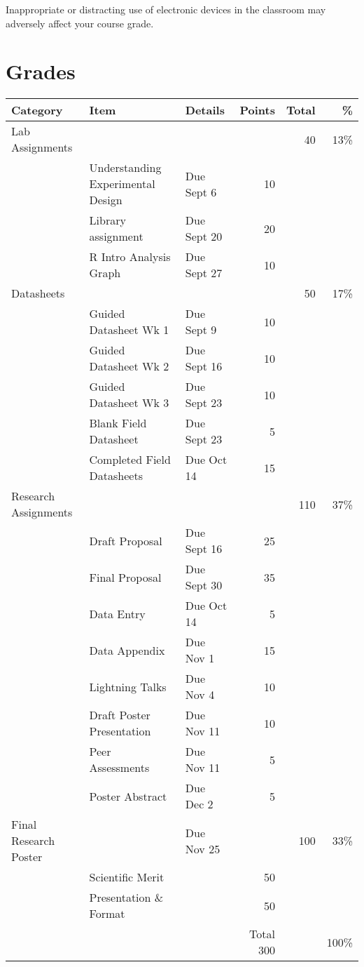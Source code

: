 \documentclass{tufte-handout}
\begin{document}
\begin{fullwidth}
Inappropriate or distracting use of electronic devices in the classroom may adversely affect your course grade. 

\section{Grades}













				

\begin{tabular}{l l l r r r}
Category & Item & Details & Points  & Total & \% \\
\hline
Lab Assignments & & &  & 40 & 13\% \\
& Understanding Experimental Design & Due Sept 6 &10 \\
& Library assignment & Due Sept 20 & 20 \\
& R Intro Analysis Graph & Due Sept 27 & 10 \\
\hline
Datasheets & & &  & 50 & 17\% \\
& Guided Datasheet Wk 1 & Due Sept 9 & 10 \\
& Guided Datasheet Wk 2 & Due Sept 16 & 10 \\
& Guided Datasheet Wk 3 & Due Sept 23 & 10 \\
& Blank Field Datasheet & Due Sept 23 & 5 \\
& Completed Field Datasheets & Due Oct 14 & 15 \\
\hline
Research Assignments & & & & 110 & 37\% \\
& Draft Proposal & Due Sept 16 & 25 \\
& Final Proposal & Due Sept 30 & 35 \\
& Data Entry & Due Oct 14 & 5 \\
& Data Appendix & Due Nov 1 & 15 \\
& Lightning Talks & Due Nov 4 & 10 \\
& Draft Poster Presentation & Due Nov 11 & 10 \\
& Peer Assessments & Due Nov 11 & 5 \\
& Poster Abstract & Due Dec 2 & 5 \\
\hline
Final Research Poster & & Due Nov 25 & & 100 & 33\% \\
& Scientific Merit &  & 50 \\
&  Presentation \& Format && 50 \\
\hline 
& & & Total 300 & & 100\% \\
\end{tabular}


\end{fullwidth}
\end{document}
